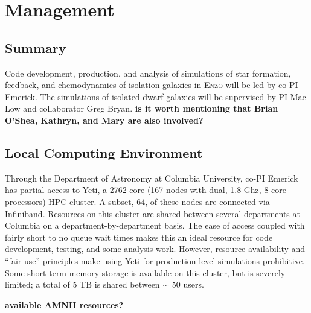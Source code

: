 \documentclass[11pt]{article}
\begin{document}
\section{Management}

\subsection{Summary}

Code development, production, and analysis of simulations of star formation, feedback, and chemodynamics of isolation galaxies in \textsc{Enzo} will be led by co-PI Emerick. The simulations of isolated dwarf galaxies will be supervised by PI Mac Low and collaborator Greg Bryan. {\bf is it worth mentioning that Brian O'Shea, Kathryn, and Mary are also involved?}

\subsection{Local Computing Environment}

Through the Department of Astronomy at Columbia University, co-PI Emerick has partial access to Yeti, a 2762 core (167 nodes with dual, 1.8 Ghz, 8 core processors) HPC cluster. A subset, 64, of these nodes are connected via Infiniband. Resources on this cluster are shared between several departments at Columbia on a department-by-department basis. The ease of access coupled with fairly short to no queue wait times makes this an ideal resource for code development, testing, and some analysis work. However, resource availability and ``fair-use'' principles make using Yeti for production level simulations prohibitive. Some short term memory storage is available on this cluster, but is severely limited; a total of 5 TB is shared between $\sim$ 50 users.

{\bf available AMNH resources?}




\end{document}
